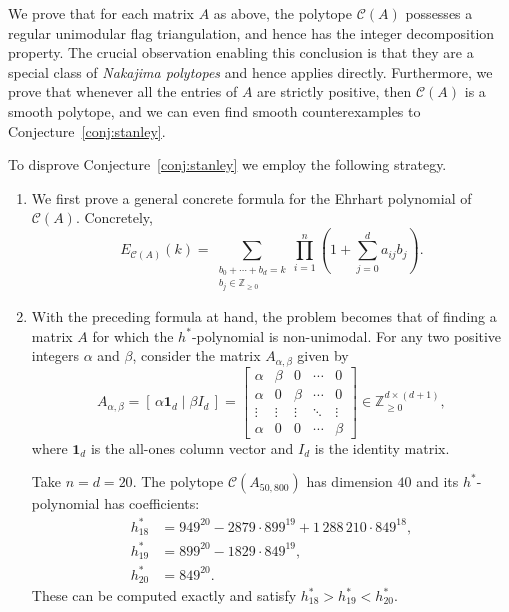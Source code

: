 \documentclass[11pt, letterpaper, english]{amsart}
\theoremstyle{teoremas}
\theoremstyle{definition}
\newcommand{\Z}{\mathbb{Z}}
\newcommand{\cC}{\mathcal C}
\begin{document}
We prove that for each matrix $A$ as above, the polytope $\mathcal{C}(A)$ possesses a regular unimodular flag triangulation, and hence has the integer decomposition property. The crucial observation enabling this conclusion is that they are a special class of \emph{Nakajima polytopes} and hence \cite[Corollary~2.9]{haase-paffenholz-piechnik-santos} applies directly. Furthermore, we prove that whenever all the entries of $A$ are strictly positive, then $\mathcal{C}(A)$ is a smooth polytope, and we can even find smooth counterexamples to Conjecture~\ref{conj:stanley}.

To disprove Conjecture~\ref{conj:stanley} we employ the following strategy. 

\begin{enumerate}[\normalfont (i)]

    \item We first prove a general concrete formula for the Ehrhart polynomial of $\mathcal{C}(A)$. Concretely,
    \[ E_{\cC(A)}(k)=
 \sum_{\substack{b_0+\cdots+b_d=k\\b_j\in\Z_{\ge0}}}
       \prod_{i=1}^n\left(1+\sum_{j=0}^d a_{ij}b_j\right). \]

    \item With the preceding formula at hand, the problem becomes that of finding a matrix $A$ for which the $h^*$-polynomial is non-unimodal. For any two positive integers $\alpha$ and $\beta$, consider the matrix $A_{\alpha,\beta}$ given by
 \[
 A_{\alpha,\beta}=[\,\alpha\mathbf1_d\mid\beta I_d\,]
 =\begin{bmatrix}
 \alpha&\beta&0&\cdots&0\\
 \alpha&0&\beta&\cdots&0\\
 \vdots&\vdots&\vdots&\ddots&\vdots\\
 \alpha&0&0&\cdots&\beta
 \end{bmatrix}\in\Z_{\ge0}^{d\times(d+1)},
 \]
where $\mathbf1_d$ is the all-ones column vector and $I_d$ is the identity matrix.

Take $n=d=20$. The polytope $\mathcal{C}(A_{50,800})$ has dimension $40$ and its $h^*$-polynomial has coefficients:
    \begin{align*}
 h_{18}^*&=949^{20}-2879\cdot899^{19}+1\,288\,210\cdot849^{18},\\
 h_{19}^*&=899^{20}-1829\cdot849^{19},\\
 h_{20}^*&=849^{20}.
\end{align*}
These can be computed exactly and satisfy $h^*_{18} > h^*_{19} < h^*_{20}$.
\end{enumerate}
\end{document}
